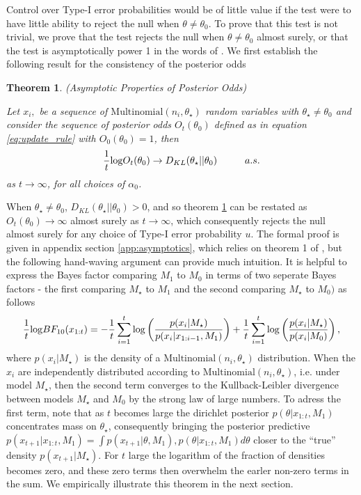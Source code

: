 \documentclass[11pt]{article}
\def\log{{\rm log}}
\newtheorem{thm}{Theorem}[section]
\begin{document}
Control over Type-I error probabilities would be of little value if the test were to have little ability to reject the null when $\theta \neq \theta_0$. To prove that this test is not trivial, we prove that the test rejects the null when $\theta \neq \theta_0$ almost surely, or that the test is asymptotically power 1 in the words of \cite{robbins}. We first establish the following result for the consistency of the posterior odds

\begin{thm}(Asymptotic Properties of Posterior Odds)
  
  \label{thm:consistency}
\noindent Let $x_i,$ be a sequence of $\text{Multinomial}(n_i,\theta_{\star})$ random variables with $\theta_{\star} \neq \theta_0$ and consider the sequence of posterior odds $O_t(\theta_0)$ defined as in equation \eqref{eq:update_rule} with $O_0(\theta_0)=1$, then
\begin{equation}
  \label{eq:consistency}
  \frac{1}{t} \log O_t(\theta_0) \rightarrow D_{KL}(\theta_{\star} || \theta_0) \hspace{1cm} a.s.
\end{equation}
as $t \rightarrow \infty$, for all choices of $\alpha_0$. 
\end{thm}
\noindent When $\theta_{\star} \neq \theta_0$, $D_{KL}(\theta_{\star} || \theta_0) > 0$, and so theorem \ref{thm:consistency} can be restated as $O_t(\theta_0) \rightarrow \infty$ almost surely as $t \rightarrow \infty$, which consequently rejects the null almost surely for any choice of Type-I error probability $u$. The formal proof is given in appendix section \ref{app:asymptotics}, which relies on theorem 1 of \cite{walker}, but the following hand-waving argument can provide much intuition. It is helpful to express the Bayes factor comparing $M_1$ to $M_0$ in terms of two seperate Bayes factors - the first comparing $M_{\star}$ to $M_1$ and the second comparing $M_{\star}$ to $M_0)$ as follows
\begin{align*}
 \frac{1}{t} \log BF_{10}(x_{1:t}) = - \frac{1}{t}\sum_{i=1}^{t}\log \left( \frac{p(x_{i}|M_\star)}{p(x_{i}|x_{1:i-1},M_1)}\right) + \frac{1}{t}\sum_{i=1}^{t} \log  \left( \frac{p(x_{i}|M_\star)}{p(x_{i}|M_0)}\right),\\
\end{align*}
where  $p(x_i|M_\star)$ is the density of a $\text{Multinomial}(n_i,\theta_{\star})$ distribution.
When the $x_i$ are independently distributed according to $\text{Multinomial}(n_i, \theta_\star)$, i.e. under model $M_\star$, then the second term converges to the Kullback-Leibler divergence between models $M_\star$ and $M_0$ by the strong law of large numbers. To adress the first term, note that as $t$ becomes large the dirichlet posterior $p(\theta|x_{1:t}, M_1)$ concentrates mass on $\theta_\star$, consequently bringing the posterior predictive $p(x_{t+1}|x_{1:t},M_1) =\int p(x_{t+1}|\theta,M_1),p(\theta|x_{1:t},M_1) d\theta$ closer to the ``true'' density $p(x_{t+1}|M_{\star})$. For $t$ large the logarithm of the fraction of densities becomes zero, and these zero terms then overwhelm the earler non-zero terms in the sum. We empirically illustrate this theorem in the next section.
\end{document}
